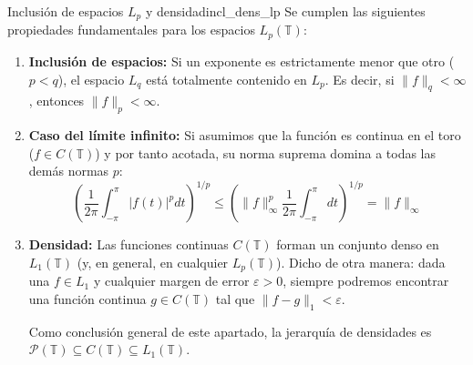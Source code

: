 \begin{proposicion}{Inclusión de espacios $L_p$ y densidad}{incl_dens_lp}
Se cumplen las siguientes propiedades fundamentales para los espacios $L_p(\mathbb{T})$:
\begin{enumerate}
    \item \textbf{Inclusión de espacios:} Si un exponente es estrictamente menor que otro ($p < q$), el espacio $L_q$ está totalmente contenido en $L_p$. Es decir, si $\|f\|_q < \infty$, entonces $\|f\|_p < \infty$.
    
    \item \textbf{Caso del límite infinito:} Si asumimos que la función es continua en el toro ($f \in C(\mathbb{T})$) y por tanto acotada, su norma suprema domina a todas las demás normas $p$:
    \begin{equation*}
        \left( \frac{1}{2\pi} \int_{-\pi}^{\pi} |f(t)|^p dt \right)^{1/p} \le \left( \|f\|_\infty^p \frac{1}{2\pi} \int_{-\pi}^{\pi} dt \right)^{1/p} = \|f\|_\infty
    \end{equation*}
    
    \item \textbf{Densidad:} Las funciones continuas $C(\mathbb{T})$ forman un conjunto denso en $L_1(\mathbb{T})$ (y, en general, en cualquier $L_p(\mathbb{T})$). Dicho de otra manera: dada una $f \in L_1$ y cualquier margen de error $\varepsilon > 0$, siempre podremos encontrar una función continua $g \in C(\mathbb{T})$ tal que $\|f - g\|_1 < \varepsilon$. 
    
    Como conclusión general de este apartado, la jerarquía de densidades es $\mathcal{P}(\mathbb{T}) \subseteq C(\mathbb{T}) \subseteq L_1(\mathbb{T})$.
\end{enumerate}
\end{proposicion}

